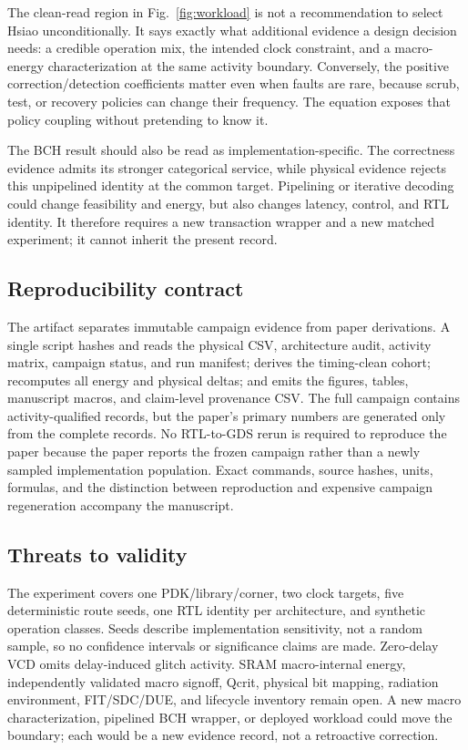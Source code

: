 \documentclass[conference]{IEEEtran}
\begin{document}
The clean-read region in Fig.~\ref{fig:workload} is not a recommendation to
select Hsiao unconditionally. It says exactly what additional evidence a design
decision needs: a credible operation mix, the intended clock constraint, and a
macro-energy characterization at the same activity boundary. Conversely, the
positive correction/detection coefficients matter even when faults are rare,
because scrub, test, or recovery policies can change their frequency. The
equation exposes that policy coupling without pretending to know it.

The BCH result should also be read as implementation-specific. The correctness
evidence admits its stronger categorical service, while physical evidence rejects
this unpipelined identity at the common target. Pipelining or iterative decoding
could change feasibility and energy, but also changes latency, control, and RTL
identity. It therefore requires a new transaction wrapper and a new matched
experiment; it cannot inherit the present record.

\subsection{Reproducibility contract}
The artifact separates immutable campaign evidence from paper derivations. A
single script hashes and reads the physical CSV, architecture audit, activity
matrix, campaign status, and run manifest; derives the timing-clean cohort;
recomputes all energy and physical deltas; and emits the figures, tables,
manuscript macros, and claim-level provenance CSV. The full campaign contains
\CampaignEfiveRecordCount{} activity-qualified records, but the paper's primary
numbers are generated only from the \PrimaryEfiveRecordCount{} complete records.
No RTL-to-GDS rerun is required to reproduce the paper because the paper reports
the frozen campaign rather than a newly sampled implementation population.
Exact commands, source hashes, units, formulas, and the distinction between
reproduction and expensive campaign regeneration accompany the manuscript.

\balance
\subsection{Threats to validity}

The experiment covers one PDK/library/corner, two clock targets, five
deterministic route seeds, one RTL identity per architecture, and synthetic
operation classes. Seeds describe implementation sensitivity, not a random
sample, so no confidence intervals or significance claims are made. Zero-delay
VCD omits delay-induced glitch activity. SRAM macro-internal energy, independently
validated macro signoff, Qcrit, physical bit mapping, radiation environment,
FIT/SDC/DUE, and lifecycle inventory remain open. A new macro characterization,
pipelined BCH wrapper, or deployed workload could move the boundary; each would
be a new evidence record, not a retroactive correction.
\end{document}
